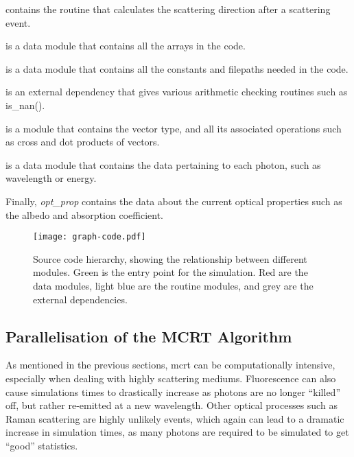  contains the routine that calculates the scattering direction after a scattering event.

 is a data module that contains all the arrays in the code.

 is a data module that contains all the constants and filepaths needed in the code.

 is an external dependency that gives various arithmetic checking routines such as is_nan().

 is a module that contains the vector type, and all its associated operations such as cross and dot products of vectors.

 is a data module that contains the data pertaining to each photon, such as wavelength or energy.

\noindent Finally, {\color{red} \textit{opt_prop}} contains the data about the current optical properties such as the albedo and absorption coefficient.


\begin{figure}[!htbp]
	\centering
	\texttt{[image: graph-code.pdf]}
	\caption{Source code hierarchy, showing the relationship between different modules. Green is the entry point for the simulation. Red are the data modules, light blue are the routine modules, and grey are the external dependencies.}
	\label{fig:codegraph}
\end{figure}



\subsection*{Parallelisation of the MCRT Algorithm}\label{sec:parasec}

As mentioned in the previous sections, \gls*{mcrt} can be computationally intensive, especially when dealing with highly scattering mediums. Fluorescence can also cause simulations times to drastically increase as photons are no longer ``killed'' off, but rather re-emitted at a new wavelength. Other optical processes such as Raman scattering are highly unlikely events, which again can lead to a dramatic increase in simulation times, as many photons are required to be simulated to get ``good'' statistics.

